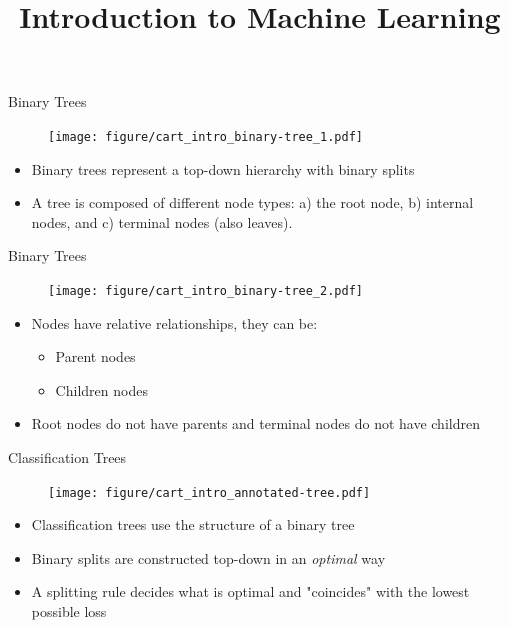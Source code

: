 \documentclass[11pt,compress,t,notes=noshow, xcolor=table]{beamer}
\title{Introduction to Machine Learning}
\institute{\href{https://compstat-lmu.github.io/lecture_i2ml/}{compstat-lmu.github.io/lecture\_i2ml}}
\date{}
\begin{document}
\sloppy

\begin{vbframe}{Binary Trees}
    \begin{figure}
    \centering
      \texttt{[image: figure/cart\_intro\_binary-tree\_1.pdf]}
    \end{figure}
  \begin{itemize}
    \item Binary trees represent a top-down hierarchy with binary splits
    \item A tree is composed of different node types: a) the root node, b) internal nodes, and c) terminal nodes (also leaves).
  \end{itemize}
\end{vbframe}

\begin{vbframe}{Binary Trees}
    \begin{figure}
    \centering
      \texttt{[image: figure/cart\_intro\_binary-tree\_2.pdf]}
    \end{figure}
  \begin{itemize}
    \item Nodes have relative relationships, they can be:
    \begin{itemize}
    \item Parent nodes
    \item Children nodes
    \end{itemize}
    \item Root nodes do not have parents and terminal nodes do not have children
  \end{itemize}
\end{vbframe}

\begin{vbframe}{Classification Trees}
    \begin{figure}
    \centering
      \texttt{[image: figure/cart\_intro\_annotated-tree.pdf]}
    \end{figure}
  \begin{itemize}
    \item Classification trees use the structure of a binary tree
    \item Binary splits are constructed top-down in an \emph{optimal} way
    \item A splitting rule decides what is optimal and "coincides" with the lowest possible loss
  \end{itemize}
\end{vbframe}
\end{document}
